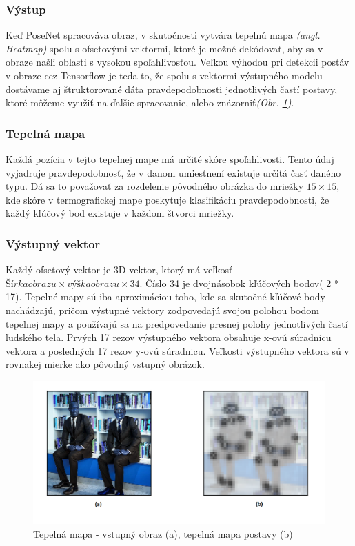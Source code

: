 \documentclass[slovak,master,dept460,male,cpp,cpdeclaration]{diploma}
\begin{document}
\subsubsection{Výstup}
Keď PoseNet spracováva obraz, v skutočnosti vytvára tepelnú mapa \textit{(angl. Heatmap)} spolu s ofsetovými vektormi, ktoré je možné dekódovať, aby sa v obraze našli oblasti s vysokou spoľahlivosťou. Veľkou výhodou pri detekcii postáv v obraze cez Tensorflow je teda to, že spolu s vektormi výstupného modelu dostávame aj štruktorované dáta pravdepodobnosti jednotlivých častí postavy, ktoré môžeme využiť na ďalšie spracovanie, alebo znázorniť\textit{(Obr. \ref{fig:tfPoseHeatmap})}.

\subsubsection{Tepelná mapa}
Každá pozícia v tejto tepelnej mape má určité skóre spoľahlivosti. Tento údaj vyjadruje pravdepodobnosť, že v danom umiestnení existuje určitá časť daného typu. Dá sa to považovať za rozdelenie pôvodného obrázka do mriežky \textit{$15\times 15$}, kde skóre v termografickej mape poskytuje klasifikáciu pravdepodobnosti, že každý kľúčový bod existuje v každom štvorci mriežky.

\subsubsection{Výstupný vektor}
Každý ofsetový vektor je 3D vektor, ktorý má veľkosť \textit{$Šírka obrazu \times výška obrazu \times 34$}. Číslo 34 je dvojnásobok kľúčových bodov( 2 * 17). Tepelné mapy sú iba aproximáciou toho, kde sa skutočné kľúčové body nachádzajú, pričom výstupné vektory zodpovedajú svojou polohou bodom tepelnej mapy a používajú sa na predpovedanie presnej polohy jednotlivých častí ľudského tela. Prvých 17 rezov výstupného vektora obsahuje x-ovú súradnicu vektora a posledných 17 rezov y-ovú súradnicu. Veľkosti výstupného vektora sú v rovnakej mierke ako pôvodný vstupný obrázok.

\begin{figure}[H]
	\centering
	\includegraphics[width=1\textwidth]{Figures/tfPose1.png}
	\caption{Tepelná mapa  - vstupný obraz (a), tepelná mapa postavy (b)}
	\label{fig:tfPoseHeatmap}
\end{figure}
\end{document}
